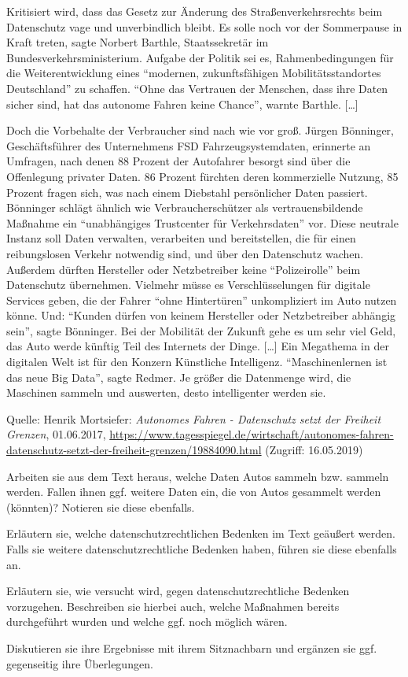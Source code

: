 \documentclass[9pt, a4paper, landscape]{scrartcl}
\begin{document}
\begin{zeilenNrZweispaltig}
Kritisiert wird, dass das Gesetz zur Änderung des Straßenverkehrsrechts beim Datenschutz vage und unverbindlich bleibt. Es solle noch vor der Sommerpause in Kraft treten, sagte Norbert Barthle, Staatssekretär im Bundesverkehrsministerium. Aufgabe der Politik sei es, Rahmenbedingungen für die Weiterentwicklung eines \enquote{modernen, zukunftsfähigen Mobilitätsstandortes Deutschland} zu schaffen. \enquote{Ohne das Vertrauen der Menschen, dass ihre Daten sicher sind, hat das autonome Fahren keine Chance}, warnte Barthle. [\dots]

Doch die Vorbehalte der Verbraucher sind nach wie vor groß. Jürgen Bönninger, Geschäftsführer des Unternehmens FSD Fahrzeugsystemdaten, erinnerte an Umfragen, nach denen 88 Prozent der Autofahrer besorgt sind über die Offenlegung privater Daten. 86 Prozent fürchten deren kommerzielle Nutzung, 85 Prozent fragen sich, was nach einem Diebstahl persönlicher Daten passiert. Bönninger schlägt ähnlich wie Verbraucherschützer als vertrauensbildende Maßnahme ein \enquote{unabhängiges Trustcenter für Verkehrsdaten} vor. Diese neutrale Instanz soll Daten verwalten, verarbeiten und bereitstellen, die für einen reibungslosen Verkehr notwendig sind, und über den Datenschutz wachen. Außerdem dürften Hersteller oder Netzbetreiber keine \enquote{Polizeirolle} beim Datenschutz übernehmen. Vielmehr müsse es Verschlüsselungen für digitale Services geben, die der Fahrer \enquote{ohne Hintertüren} unkompliziert im Auto nutzen könne. Und: \enquote{Kunden dürfen von keinem Hersteller oder Netzbetreiber abhängig sein}, sagte Bönninger. Bei der Mobilität der Zukunft gehe es um sehr viel Geld, das Auto werde künftig Teil des Internets der Dinge. [\dots] Ein Megathema in der digitalen Welt ist für den Konzern Künstliche Intelligenz. \enquote{Maschinenlernen ist das neue Big Data}, sagte Redmer. Je größer die Datenmenge wird, die Maschinen sammeln und auswerten, desto intelligenter werden sie.

\nolinenumbers
\smallskip
\small Quelle: Henrik Mortsiefer: \emph{Autonomes Fahren - Datenschutz setzt der Freiheit Grenzen}, 01.06.2017,  \url{https://www.tagesspiegel.de/wirtschaft/autonomes-fahren-datenschutz-setzt-der-freiheit-grenzen/19884090.html} (Zugriff: 16.05.2019)

\begin{enumeraten}
	\item Arbeiten sie aus dem Text heraus, welche Daten Autos sammeln bzw. sammeln werden. Fallen ihnen ggf. weitere Daten ein, die von Autos gesammelt werden (könnten)? Notieren sie diese ebenfalls.
	\item Erläutern sie, welche datenschutzrechtlichen Bedenken im Text geäußert werden. Falls sie weitere datenschutzrechtliche Bedenken haben, führen sie diese ebenfalls an.
	\item Erläutern sie, wie versucht wird, gegen datenschutzrechtliche Bedenken vorzugehen. Beschreiben sie hierbei auch, welche Maßnahmen bereits durchgeführt wurden und welche ggf. noch möglich wären.
	\item Diskutieren sie ihre Ergebnisse mit ihrem Sitznachbarn und ergänzen sie ggf. gegenseitig ihre Überlegungen.
\end{enumeraten}
\end{zeilenNrZweispaltig}
\end{document}
